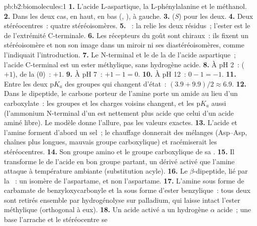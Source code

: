\begin{solution}{pb:b2:biomolecules:1}
\textbf{1.} L'acide L-aspartique, la L-phénylalanine et le méthanol.
\textbf{2.} Dans les deux cas,  en haut,  en bas (, ), 
à gauche.
\textbf{3.} (\textit{S}) pour les deux.
\textbf{4.} Deux stéréocentres~: quatre stéréoisomères.
\textbf{5.} ~: la  relie les deux
résidus~; l'ester est le  de l'extrémité C-terminale.
\textbf{6.} Les récepteurs du goût sont chiraux~: ils fixent un stéréoisomère et non son image dans un miroir
ni ses diastéréoisomères, comme l'indiquait l'introduction.
\textbf{7.} Le  N-terminal et le  de la  de l'acide aspartique~; l'acide
C-terminal est un ester méthylique, sans hydrogène acide.
\textbf{8.} À pH 2~:  ($+1$),  de la  (0)~: $+1$.
\textbf{9.} À pH 7~: $+1 - 1 = 0$.
\textbf{10.} À pH 12~: $0 - 1 = -1$.
\textbf{11.} Entre les deux $\mathrm pK_a$ des groupes qui changent d'état~: $(3.9 + 9.9)/2 \approx 6.9$.
\textbf{12.} Dans le dipeptide, le carbone porteur de l'amine porte un amide au lieu d'un carboxylate~:
les groupes et les charges voisins changent, et les $\mathrm pK_a$ aussi (l'ammonium N-terminal d'un
 est nettement plus acide que celui d'un acide aminé libre). Le modèle donne l'allure, pas les
valeurs exactes.
\textbf{13.} L'acide et l'amine forment d'abord un sel~; le chauffage donnerait des mélanges (Asp--Asp,
chaînes plus longues, mauvais groupe carboxylique) et racémiserait les stéréocentres.
\textbf{14.} Son groupe amino et le groupe carboxylique de sa .
\textbf{15.} Il transforme le  de l'acide en bon groupe partant, un dérivé activé que l'amine attaque
à température ambiante (substitution acyle).
\textbf{16.} Le $\beta$-dipeptide, lié par la ~: un isomère de l'aspartame, et non l'aspartame.
\textbf{17.} L'amine sous forme de carbamate de benzyloxycarbonyle et la  sous forme d'ester
benzylique~: tous deux sont retirés ensemble par hydrogénolyse sur palladium, qui laisse intact l'ester
méthylique (orthogonal à eux).
\textbf{18.} Un acide activé a un hydrogène $\alpha$ acide~; une base l'arrache et le stéréocentre se

\end{solution}
